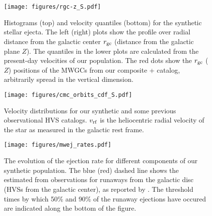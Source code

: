 \documentclass[twocolumn]{aastex631}
\begin{document}
\begin{figure*}
    \begin{centering}
        \texttt{[image: figures/rgc-z\_S.pdf]}
        \caption{
            Histograms (top) and velocity quantiles (bottom) for the synthetic stellar ejecta.
            The left (right) plots show the profile over radial distance from the galactic center $r_{\rm gc}$ (distance from the galactic plane $Z$).
            The quantiles in the lower plots are calculated from the present-day velocities of our population.
            The red dots show the $r_{\rm gc}$ ($Z$) positions of the MWGCs from our composite \citet{2018MNRAS.478.1520B}+\citet{2010arXiv1012.3224H} catalog, arbitrarily spread in the vertical dimension.
        }
        \label{fig:rgc-z}
    \end{centering}
\end{figure*}

\begin{figure}
    \begin{centering}
        \texttt{[image: figures/cmc\_orbits\_cdf\_S.pdf]}
        \caption{
            Velocity distributions for our synthetic and some previous observational HVS catalogs.
            $v_{\rm rf}$ is the heliocentric radial velocity of the star as measured in the galactic rest frame.
        }
        \label{fig:cmc_orbits_cdf}
    \end{centering}
\end{figure}

\begin{figure}
    \begin{centering}
        \texttt{[image: figures/mwej\_rates.pdf]}
        \caption{
            The evolution of the ejection rate for different components of our synthetic population.
            The blue (red) dashed line shows the estimated from observations for runaways from the galactic disc (HVSs from the galactic center), as reported by \citet{2015ARA&A..53...15B}.
            The threshold times by which 50\% and 90\% of the runaway ejections have occured are indicated along the bottom of the figure.
        }
        \label{fig:mwej_rates}
    \end{centering}
\end{figure}
\end{document}
